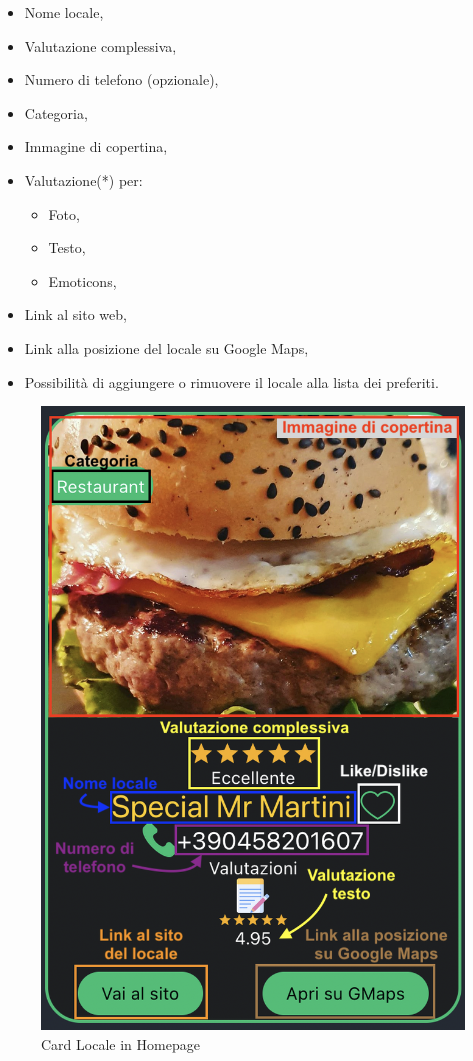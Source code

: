 \begin{itemize}
\item Nome locale,
\item Valutazione complessiva,
\item Numero di telefono (opzionale),
\item Categoria,
\item Immagine di copertina,
\item Valutazione(*) per:
\begin{itemize}
\item Foto,
\item Testo,
\item Emoticons,
\end{itemize}
\item Link al sito web,
\item Link alla posizione del locale su Google Maps,
\item Possibilità di aggiungere o rimuovere il locale alla lista dei preferiti.
\end{itemize}

\begin{figure}[H]
\centering
\includegraphics[scale=0.4]{./images/Homepage/Card.png} 
\caption{Card Locale in Homepage}
\end{figure}


